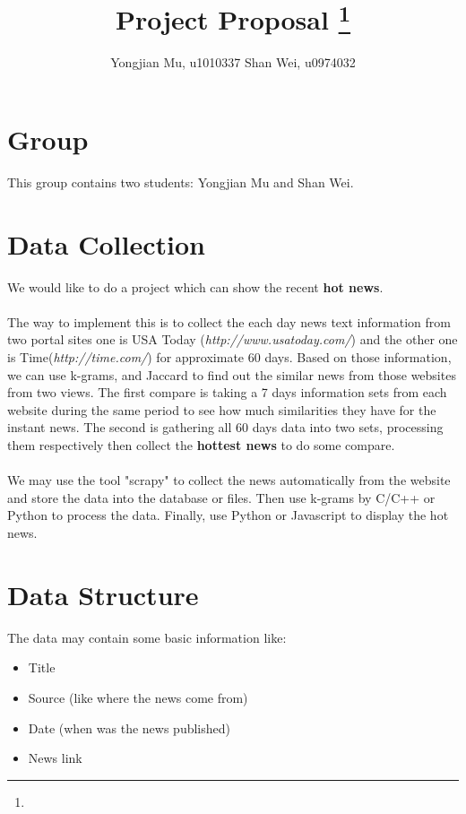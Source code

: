 \documentclass[11pt]{article}
\title{Project Proposal
\footnote{\s{CS 6140; \;\; Spring 2016 \hfill
Instructor: Jeff M. Phillips, University of Utah}
}
}
\author{Yongjian Mu, u1010337 \qquad Shan Wei, u0974032}
\begin{document}
\maketitle





\section{Group}
This group contains two students: Yongjian Mu and Shan Wei.

\section{Data Collection}
We would like to do a project which can show the recent \textbf{hot news}.\\
\\
The way to implement this is to collect the each day news text information from two portal sites one is USA Today (\textit{http://www.usatoday.com/}) and the other one is Time(\textit{http://time.com/}) for approximate 60 days. Based on those information, we can use k-grams, and Jaccard to find out the similar news from those websites from two views. The first compare is taking a 7 days information sets from each website during the same period to see how much similarities they have for the instant news. The second is gathering all 60 days data into two sets, processing them respectively then collect the \textbf{hottest news} to do some compare.\\
\\
We may use the tool "scrapy" to collect the news automatically from the website and store the data into the database or files. Then use k-grams by C/C++ or Python to process the data. Finally, use Python or Javascript to display the hot news.

\section{Data Structure}
The data may contain some basic information like:
\begin{itemize}
\item Title
\item Source (like where the news come from)
\item Date (when was the news published)
\item News link
\end{itemize}
\end{document}
